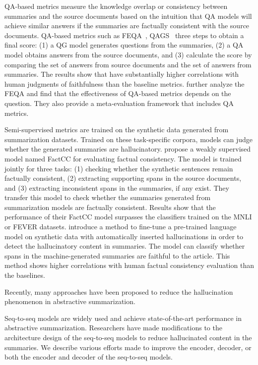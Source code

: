 QA-based metrics measure the knowledge overlap or consistency between summaries and the source documents based on the intuition that QA models will achieve similar answers if the summaries are factually consistent with the source documents. QA-based metrics such as FEQA~, QAGS~ three steps to obtain a final score: (1) a QG model generates questions from the summaries, (2) a QA model obtains answers from the source documents, and (3) calculate the score by comparing the set of answers from source documents and the set of answers from summaries.
The results show that  have substantially higher correlations with human judgments of faithfulness than the baseline metrics. 
 further analyze the FEQA and find that the effectiveness of QA-based metrics depends on the question. They also provide a meta-evaluation framework that includes QA metrics.

Semi-supervised metrics are trained on the synthetic data generated from summarization datasets. Trained on these task-specific corpora, models can judge whether the generated summaries are hallucinatory.
 propose a weakly supervised model named FactCC for evaluating factual consistency. The model is trained jointly for three tasks: (1) checking whether the synthetic sentences remain factually consistent, (2) extracting supporting spans in the source documents, and (3) extracting inconsistent spans in the summaries, if any exist.
They transfer this model to check whether the summaries generated from summarization models are factually consistent. Results show that the performance of their FactCC model surpasses the classifiers trained on the MNLI or FEVER datasets.  introduce a method to fine-tune a pre-trained language model on synthetic data with automatically inserted hallucinations in order to detect the hallucinatory content in summaries. The model can classify whether spans in the machine-generated summaries are faithful to the article. This method shows higher correlations with human factual consistency evaluation than the baselines.

Recently, many approaches have been proposed to reduce the hallucination phenomenon in abstractive summarization.

Seq-to-seq  models are widely used and achieve state-of-the-art performance in abstractive summarization. Researchers have made modifications to the architecture design of the seq-to-seq models to reduce hallucinated content in the summaries. We describe various efforts made to improve the encoder, decoder, or both the encoder and decoder of the seq-to-seq models.

